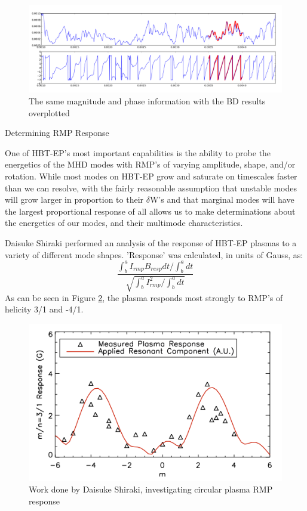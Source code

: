 \documentclass{article}
\begin{document}
\newpage
\begin{figure}[htb]
\includegraphics[width = \textwidth]{./Report_pic_bd_sig.png}\caption{The same magnitude and phase information with the BD results overplotted}
\label{bd_sig}
\end{figure}
\newpage
\begin{center}
\begin{LARGE}
Determining RMP Response
\end{LARGE}
\end{center}
\vspace{0.25in}
\par
One of HBT-EP's most important capabilities is the ability to probe the energetics of the MHD modes with RMP's of varying amplitude, shape, and/or rotation.  While most modes on HBT-EP grow and saturate on timescales faster than we can resolve, with the fairly reasonable assumption that unstable modes will grow larger in proportion to their $\delta$W's and that marginal modes will have the largest proportional response of all allows us to make determinations about the energetics of our modes, and their multimode characteristics.\par
Daisuke Shiraki performed an analysis of the response of HBT-EP plasmas to a variety of different mode shapes.  'Response' was calculated, in units of Gauss, as: $$ \frac{ \int^a_b{I_{rmp}B_{resp}dt}/\int^a_bdt }{ \sqrt{\int^a_b{I_{rmp}^2}/\int^a_bdt}}$$
As can be seen in Figure \ref{shiraki_RMP_shape}, the plasma responds most strongly to RMP's of helicity 3/1 and -4/1.
\begin{figure}[h!]
\includegraphics[width = \textwidth]{./Shiraki_thesis_Fig_7_1.png}\caption{Work done by Daisuke Shiraki, investigating circular plasma RMP response}
\label{shiraki_RMP_shape}
\end{figure}
\end{document}
